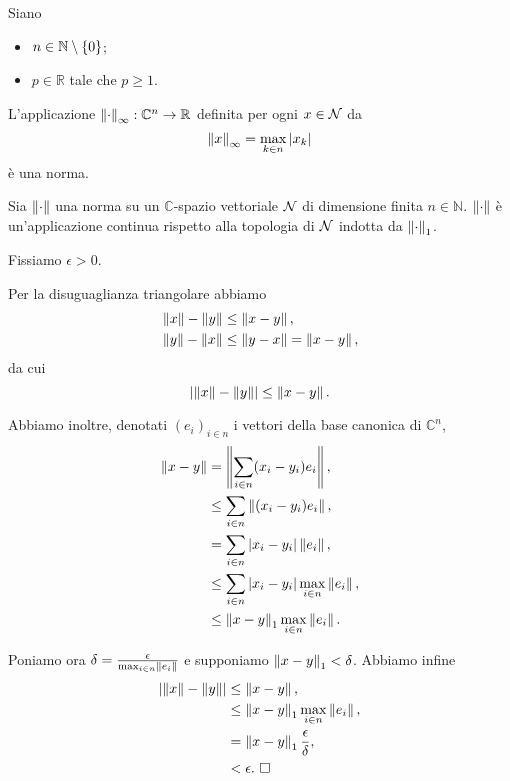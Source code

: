 \begin{Theorem}
  Siano
  \begin{itemize}
    \item $n \in \mathbb{N} \setminus \lbrace 0 \rbrace$;
    \item $p \in \mathbb{R}$ tale che $p \geq 1$.
  \end{itemize}
  L'applicazione $\Norm{\cdot}[\infty]: \mathbb{C}^n \rightarrow \mathbb{R}$
  definita per ogni $x \in \mathcal{N}$ da
  \[
    \Norm{x}[\infty] = \max_{k \in n} \AbsoluteValue{x_k}
  \]
  \`e una norma.
\end{Theorem}
\begin{Theorem}
  Sia $\Norm{\cdot}$ una norma su un $\mathbb{C}$-spazio vettoriale
  $\mathcal{N}$ di dimensione finita $n \in \mathbb{N}$.
  $\Norm{\cdot}$ \`e un'applicazione continua rispetto alla topologia
  di $\mathcal{N}$ indotta da $\Norm{\cdot}[1]$.
\end{Theorem}
\Proof Fissiamo $\epsilon > 0$.
\par Per la disuguaglianza triangolare abbiamo
\begin{align*}
  &\Norm{x} - \Norm{y} \leq \Norm{x - y},\\
  &\Norm{y} - \Norm{x} \leq \Norm{y - x} = \Norm{x - y},
\end{align*}
da cui
\[
  \AbsoluteValue{\Norm{x} - \Norm{y}} \leq \Norm{x - y}.
\]
\par Abbiamo inoltre, denotati $(e_i)_{i \in n}$ i vettori della base canonica
di $\mathbb{C}^n$,
\begin{align*}
  \Norm{x - y}
  &= \Norm{\sum_{i \in n} (x_i - y_i) e_i},\\
  &\leq \sum_{i \in n} \Norm{(x_i - y_i) e_i},\\
  &= \sum_{i \in n} \AbsoluteValue{x_i - y_i} \Norm{e_i},\\
  &\leq \sum_{i \in n} \AbsoluteValue{x_i - y_i} \max_{i \in n} \Norm{e_i},\\
  &\leq \Norm{x - y}[1] \max_{i \in n} \Norm{e_i}.
\end{align*}
\par Poniamo ora
$\delta = \frac{\epsilon}{\max_{i \in n} \Norm{e_i}}$ e supponiamo
$\Norm{x - y}[1] < \delta$. Abbiamo infine
\begin{align*}
  \AbsoluteValue{\Norm{x} - \Norm{y}}
  &\leq \Norm{x - y},\\
  &\leq \Norm{x - y}[1] \max_{i \in n} \Norm{e_i},\\
  &= \Norm{x - y}[1] \frac{\epsilon}{\delta},\\
  &< \epsilon.\text{ \EndProof}
\end{align*}
